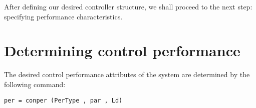 \documentclass [12pt , a4paper] {report}
\begin{document}
After defining our desired controller structure, we shall proceed to the next step: specifying performance characteristics.



\section{Determining control performance}
The desired control performance attributes of the system are determined by the following command:
\begin{lstlisting}
per = conper (PerType , par , Ld) 
\end{lstlisting}
\end{document}

